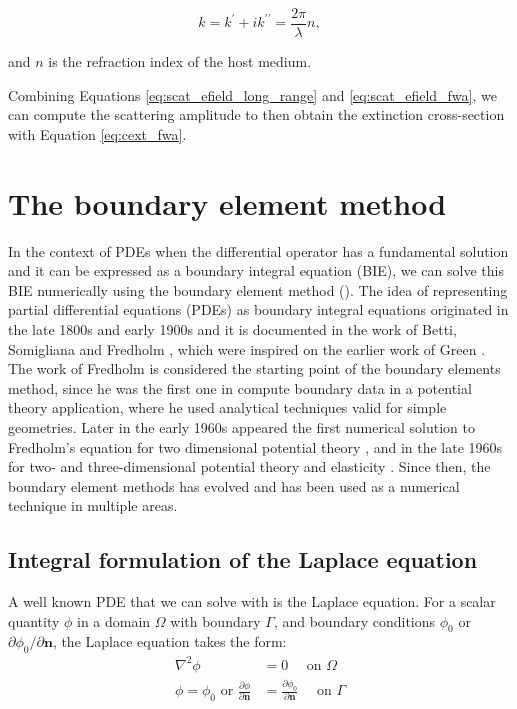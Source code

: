 \begin{equation}
    k = k^\prime + ik^{\prime\prime} = \frac{2\pi}{\lambda} n,
\end{equation}

and $n$ is the refraction index of the host medium.

Combining Equations \eqref{eq:scat_efield_long_range} and \eqref{eq:scat_efield_fwa},
we can compute the scattering amplitude to then obtain the extinction cross-section 
with Equation \eqref{eq:cext_fwa}.

\section{The boundary element method} \label{sec:lspr_bem}

In the context of PDEs when the differential operator has a fundamental solution and it can be expressed as a boundary integral equation (BIE), we can solve 
this BIE numerically using the boundary element method (\bem). The idea of representing partial differential equations (PDEs) as boundary integral 
equations originated in the late 1800s and early 1900s and it is documented in the work of Betti, Somigliana and Fredholm \cite{Betti1872,Somigliana1885,Fredholm1903},
which were inspired on the earlier work of Green \cite{Green1828}. The work of Fredholm is considered the starting point of the boundary elements method, 
since he was the first one in compute boundary data in a potential theory application, where he used analytical techniques valid for simple geometries. Later in 
the early 1960s appeared the first numerical solution to Fredholm's equation for two dimensional potential theory \cite{Jawson1963,Symm1963}, and in the late 1960s 
for two- and three-dimensional potential theory and elasticity \cite{Rizzo1967,Cruse1969}. Since then, the boundary element methods has evolved and has been used 
as a numerical technique in multiple areas\cite{Atkinson1997,McLean2000,Steinbach2008, BrebbiaDominguez1992, Katsikadelis2002}. 


\subsection{Integral formulation of the Laplace equation} \label{ssec:int_form}

A well known PDE that we can solve with \bem is the Laplace equation. For a scalar quantity $\phi$ in a domain $\Omega$ with boundary $\Gamma$, and 
boundary conditions $\phi_0$ or $\partial \phi_0/\partial \mathbf{n}$, the Laplace equation takes the form:
%
\begin{align} \label{eq:lap_pde}
\nabla^2\phi &= 0 \quad \text{ on $\Omega$} \nonumber \\
\phi = \phi_0 \text{ or } \frac{\partial \phi}{\partial \mathbf{n}} &= \frac{\partial \phi_0}{\partial \mathbf{n}} \quad \text{ on $\Gamma$} 
\end{align}


